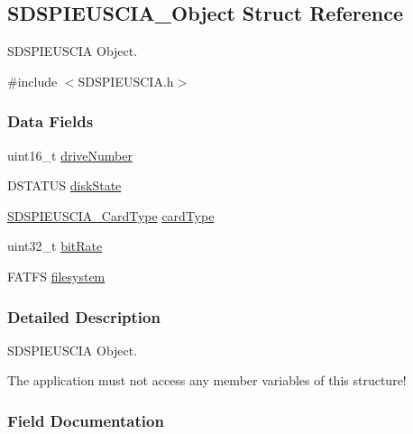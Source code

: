 \subsection{S\-D\-S\-P\-I\-E\-U\-S\-C\-I\-A\-\_\-\-Object Struct Reference}
\label{struct_s_d_s_p_i_e_u_s_c_i_a___object}


S\-D\-S\-P\-I\-E\-U\-S\-C\-I\-A Object.  




{\ttfamily \#include $<$S\-D\-S\-P\-I\-E\-U\-S\-C\-I\-A.\-h$>$}

\subsubsection*{Data Fields}
\begin{DoxyCompactItemize}
\item 
uint16\-\_\-t \hyperlink{struct_s_d_s_p_i_e_u_s_c_i_a___object_a5d6a52c5b2b7a1dda7fe2279f19c5e6b}{drive\-Number}
\item 
D\-S\-T\-A\-T\-U\-S \hyperlink{struct_s_d_s_p_i_e_u_s_c_i_a___object_adcb732d472748393dbf3a52e24b4d428}{disk\-State}
\item 
\hyperlink{_s_d_s_p_i_e_u_s_c_i_a_8h_aaf384a8a07d5fb92b9ba72250174d577}{S\-D\-S\-P\-I\-E\-U\-S\-C\-I\-A\-\_\-\-Card\-Type} \hyperlink{struct_s_d_s_p_i_e_u_s_c_i_a___object_a50815c1e112047b907a4f9d84b872727}{card\-Type}
\item 
uint32\-\_\-t \hyperlink{struct_s_d_s_p_i_e_u_s_c_i_a___object_a83aec3fd0962a754e277c9fc21f97549}{bit\-Rate}
\item 
F\-A\-T\-F\-S \hyperlink{struct_s_d_s_p_i_e_u_s_c_i_a___object_a3e10853e7c79a7b99d481353cbd71739}{filesystem}
\end{DoxyCompactItemize}


\subsubsection{Detailed Description}
S\-D\-S\-P\-I\-E\-U\-S\-C\-I\-A Object. 

The application must not access any member variables of this structure! 

\subsubsection{Field Documentation}

